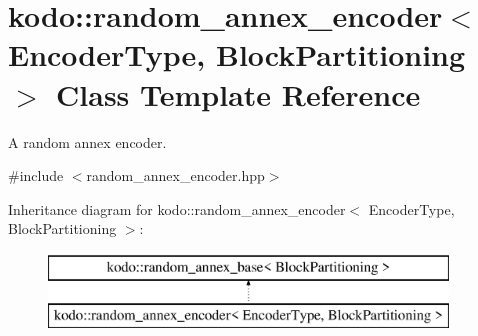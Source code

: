 \hypertarget{classkodo_1_1random__annex__encoder}{\section{kodo\-:\-:random\-\_\-annex\-\_\-encoder$<$ Encoder\-Type, Block\-Partitioning $>$ Class Template Reference}
\label{classkodo_1_1random__annex__encoder}
}


A random annex encoder.  




{\ttfamily \#include $<$random\-\_\-annex\-\_\-encoder.\-hpp$>$}

Inheritance diagram for kodo\-:\-:random\-\_\-annex\-\_\-encoder$<$ Encoder\-Type, Block\-Partitioning $>$\-:\begin{figure}[H]
\begin{center}
\leavevmode
\includegraphics[height=2.000000cm]{classkodo_1_1random__annex__encoder}
\end{center}
\end{figure}
